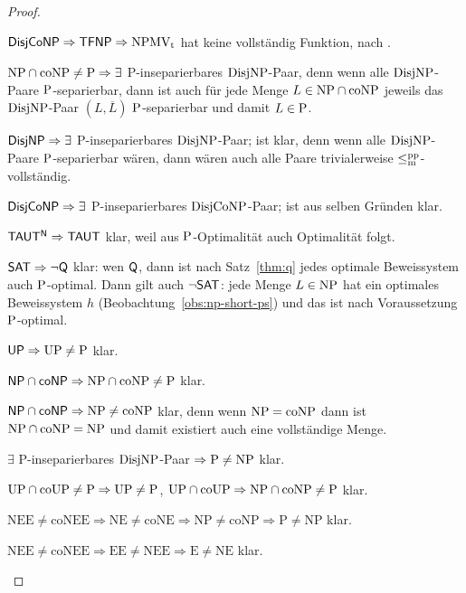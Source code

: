 \begin{proof}
\begin{Prooflist}[nosep,midpenalty=0]
\item $\hDisjCoNP \Rightarrow \hTFNP \Rightarrow \NPMVt$ hat keine vollständig Funktion, nach \textcite[Prop.~5.6, 5.10]{pudlak_incompleteness_2017}.
\item $\NP\cap\coNP\neq \P \Rightarrow\exists$ P-inseparierbares $\DisjNP$-Paar, denn wenn alle $\DisjNP$-Paare $\P$-separierbar, dann ist auch für jede Menge $L\in\NP\cap\coNP$ jeweils das $\DisjNP$-Paar $(L,\overline{L})$ $\P$-separierbar und damit $L\in\P$.
\item $\hDisjNP \Rightarrow \exists$ P-inseparierbares $\DisjNP$-Paar; ist klar, denn wenn alle $\DisjNP$-Paare $\P$-separierbar wären, dann wären auch alle Paare trivialerweise $\leqmpp$-vollständig.
\item $\hDisjCoNP \Rightarrow \exists$ P-inseparierbares $\DisjCoNP$-Paar; ist aus selben Gründen klar.
\item $\mathsf{TAUT^N} \Rightarrow \hTAUT$ klar, weil aus $\P$-Optimalität auch Optimalität folgt.
\item $\mathsf \hSAT \Rightarrow \neg\hQ $ klar: wen $\hQ$, dann ist nach Satz~\ref{thm:q} jedes optimale Beweissystem auch $\P$-optimal. Dann gilt auch $\neg\hSAT$: jede Menge $L\in\NP$ hat ein optimales Beweissystem $h$ (Beobachtung~\ref{obs:np-short-ps}) und das ist nach Voraussetzung $\P$-optimal.
\item $\hUP \Rightarrow \UP\neq\P$ klar.
\item $\hNPcoNP \Rightarrow \NP\cap\coNP\neq \P$ klar.
\item $\hNPcoNP \Rightarrow \NP\neq\coNP$ klar, denn wenn $\NP=\coNP$ dann ist $\NP\cap\coNP=\NP$ und damit existiert auch eine vollständige Menge.
\item $\exists$ P-inseparierbares $\DisjNP$-Paar $\Rightarrow \P\neq \NP$ klar.
\item $\UP\cap\coUP\neq\P \Rightarrow \UP\neq \P$, $\UP\cap\coUP\Rightarrow \NP\cap\coNP\neq\P$ klar.
\item $\mathrm{NEE\neq coNEE \Rightarrow NE \neq coNE \Rightarrow NP \neq coNP \Rightarrow P\neq NP}$ klar.
\item $\mathrm{NEE\neq coNEE \Rightarrow EE \neq NEE \Rightarrow E\neq NE}$ klar.\qedhere
\end{Prooflist}
\end{proof}


